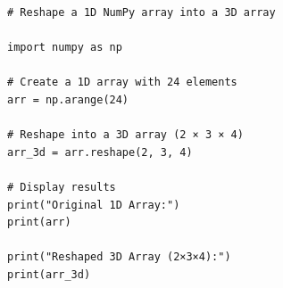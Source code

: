 \begin{verbatim}
# Reshape a 1D NumPy array into a 3D array

import numpy as np

# Create a 1D array with 24 elements
arr = np.arange(24)

# Reshape into a 3D array (2 × 3 × 4)
arr_3d = arr.reshape(2, 3, 4)

# Display results
print("Original 1D Array:")
print(arr)

print("Reshaped 3D Array (2×3×4):")
print(arr_3d)
\end{verbatim}